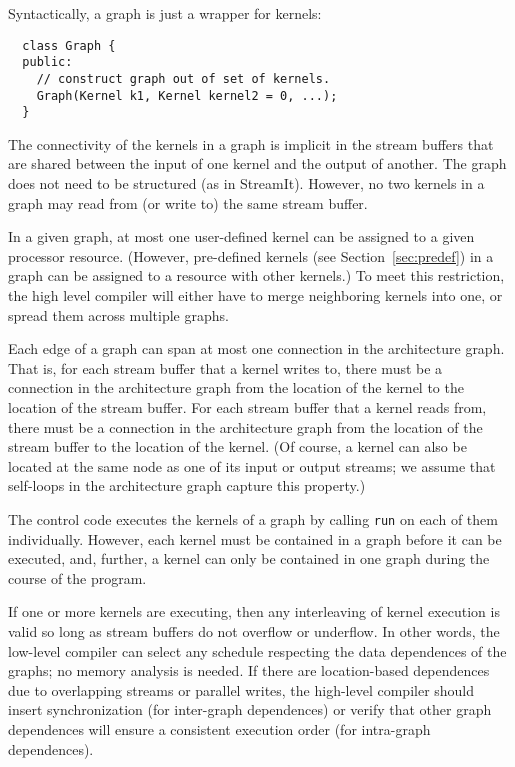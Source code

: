 Syntactically, a graph is just a wrapper for kernels:
{\small
\begin{verbatim}
  class Graph {
  public:
    // construct graph out of set of kernels.
    Graph(Kernel k1, Kernel kernel2 = 0, ...);
  }
\end{verbatim}}
\noindent The connectivity of the kernels in a graph is implicit in
the stream buffers that are shared between the input of one kernel and
the output of another.  The graph does not need to be structured (as
in StreamIt).  However, no two kernels in a graph may read from (or
write to) the same stream buffer.

In a given graph, at most one user-defined kernel can be assigned to a
given processor resource.  (However, pre-defined kernels (see
Section~\ref{sec:predef}) in a graph can be assigned to a resource
with other kernels.)  To meet this restriction, the high level
compiler will either have to merge neighboring kernels into one, or
spread them across multiple graphs.

Each edge of a graph can span at most one connection in the
architecture graph.  That is, for each stream buffer that a kernel
writes to, there must be a connection in the architecture graph from
the location of the kernel to the location of the stream buffer.  For
each stream buffer that a kernel reads from, there must be a
connection in the architecture graph from the location of the stream
buffer to the location of the kernel.  (Of course, a kernel can also
be located at the same node as one of its input or output streams; we
assume that self-loops in the architecture graph capture this
property.)


The control code executes the kernels of a graph by calling {\tt run}
on each of them individually.  However, each kernel must be contained
in a graph before it can be executed, and, further, a kernel can only
be contained in one graph during the course of the program.

If one or more kernels are executing, then any interleaving of kernel
execution is valid so long as stream buffers do not overflow or
underflow.  In other words, the low-level compiler can select any
schedule respecting the data dependences of the graphs; no memory
analysis is needed.  If there are location-based dependences due to
overlapping streams or parallel writes, the high-level compiler should
insert synchronization (for inter-graph dependences) or verify that
other graph dependences will ensure a consistent execution order (for
intra-graph dependences).

